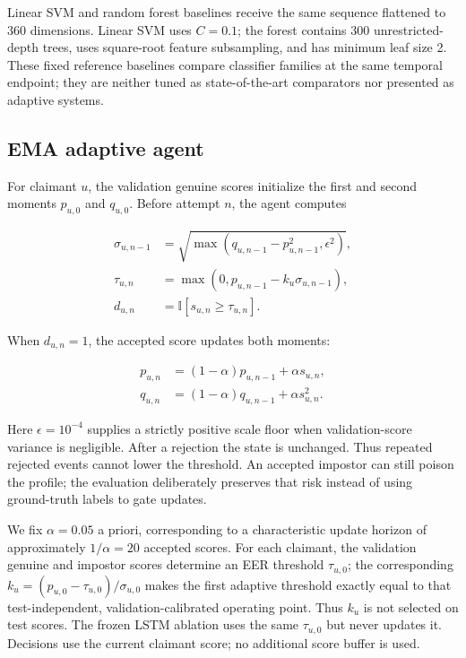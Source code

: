 \documentclass[3p,times,procedia]{elsarticle}
\begin{document}
Linear SVM and random forest baselines receive the same sequence flattened to
360 dimensions. Linear SVM uses $C=0.1$; the forest contains 300
unrestricted-depth trees, uses square-root feature subsampling, and has minimum
leaf size 2. These fixed reference baselines compare classifier families at the
same temporal endpoint; they are neither tuned as state-of-the-art comparators
nor presented as adaptive systems.

\subsection{EMA adaptive agent}

For claimant $u$, the validation genuine scores initialize the first and second
moments $p_{u,0}$ and $q_{u,0}$. Before attempt $n$, the agent computes

\begin{align}
\sigma_{u,n-1} &= \sqrt{\max(q_{u,n-1}-p_{u,n-1}^{2},\epsilon^2)},\\
\tau_{u,n} &= \max(0,p_{u,n-1}-k_u\sigma_{u,n-1}),\\
d_{u,n} &= \mathbb{I}[s_{u,n}\geq\tau_{u,n}].
\end{align}

\begin{samepage}
When $d_{u,n}=1$, the accepted score updates both moments:

\begin{align}
p_{u,n} &= (1-\alpha)p_{u,n-1}+\alpha s_{u,n},\\
q_{u,n} &= (1-\alpha)q_{u,n-1}+\alpha s_{u,n}^{2}.
\end{align}
\end{samepage}

Here $\epsilon=10^{-4}$ supplies a strictly positive scale floor when
validation-score variance is negligible. After a rejection the state is unchanged. Thus repeated rejected events
cannot lower the threshold. An accepted impostor can still poison the profile;
the evaluation deliberately preserves that risk instead of using ground-truth
labels to gate updates.

We fix $\alpha=0.05$ a priori, corresponding to a characteristic update horizon
of approximately $1/\alpha=20$ accepted scores. For each claimant, the validation genuine and
impostor scores determine an EER threshold $\tau_{u,0}$; the corresponding
$k_u=(p_{u,0}-\tau_{u,0})/\sigma_{u,0}$ makes the first adaptive threshold
exactly equal to that test-independent, validation-calibrated operating point. Thus $k_u$ is
not selected on test scores. The frozen LSTM ablation uses the same
$\tau_{u,0}$ but never updates it. Decisions use the current claimant score; no
additional score buffer is used.
\end{document}

